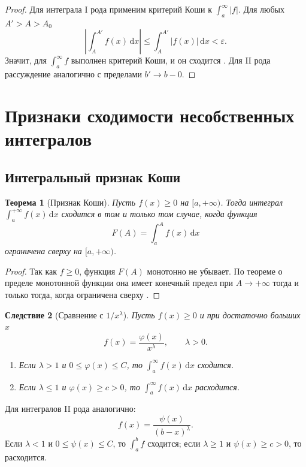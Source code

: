 \documentclass[coursework, och, times]{SCWorks1}
\newtheorem{theorem}{Теорема}
\newtheorem{corollary}[theorem]{Следствие}
\newcommand{\dd}{\,\mathrm{d}}
\newcommand{\eps}{\varepsilon}
\renewcommand{\le}{\leqslant}
\renewcommand{\ge}{\geqslant}
\begin{document}
\begin{proof}
Для интеграла I рода применим критерий Коши к \(\int_a^\infty |f|\). Для любых \(A'>A>A_0\)
\[
\left|\int_A^{A'} f(x)\dd x\right|
\le
\int_A^{A'} |f(x)|\dd x<\eps.
\]
Значит, для \(\int_a^\infty f\) выполнен критерий Коши, и он сходится \cite{kudryavtsev}. Для II рода рассуждение аналогично с пределами \(b'\to b-0\).
\end{proof}

\section{Признаки сходимости несобственных интегралов}\label{sec:priznaki}

\subsection{Интегральный признак Коши}
\begin{theorem}[Признак Коши]
Пусть \(f(x)\ge0\) на \([a,+\infty)\). Тогда интеграл \(\int_a^{+\infty}f(x)\dd x\) сходится в том и только том случае, когда функция
\[
F(A)=\int_a^A f(x)\dd x
\]
ограничена сверху на \([a,+\infty)\).
\end{theorem}

\begin{proof}
Так как \(f\ge0\), функция \(F(A)\) монотонно не убывает. По теореме о пределе монотонной функции она имеет конечный предел при \(A\to+\infty\) тогда и только тогда, когда ограничена сверху \cite{fikht8}. 
\end{proof}

\begin{corollary}[Сравнение с \(1/x^\lambda\)]
Пусть \(f(x)\ge0\) и при достаточно больших \(x\)
\[
f(x)=\frac{\varphi(x)}{x^\lambda},\qquad \lambda>0.
\]
\begin{enumerate}
\item Если \(\lambda>1\) и \(0\le\varphi(x)\le C\), то \(\int_a^\infty f(x)\dd x\) сходится.
\item Если \(\lambda\le1\) и \(\varphi(x)\ge c>0\), то \(\int_a^\infty f(x)\dd x\) расходится.
\end{enumerate}
\end{corollary}

Для интегралов II рода аналогично:
\[
f(x)=\frac{\psi(x)}{(b-x)^\lambda}.
\]
Если \(\lambda<1\) и \(0\le\psi(x)\le C\), то \(\int_a^b f\) сходится; если \(\lambda\ge1\) и \(\psi(x)\ge c>0\), то расходится.
\end{document}

